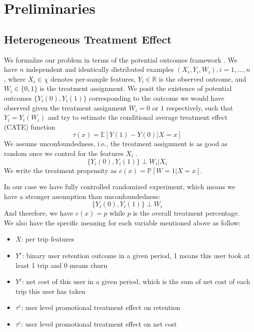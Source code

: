 \section{Preliminaries}

\subsection{Heterogeneous Treatment Effect}

We formalize our problem in terms of the potential outcomes framework \cite{rubin1974estimating}. We have $n$ independent and identically distributed examples $(X_i, Y_i, W_i), i = 1, ..., n$, where $X_i \in \chi$ denotes per-sample features, $Y_i \in \mathbb{R}$ is the observed outcome, and $W_i \in \{0, 1\}$ is the treatment assignment. We posit the existence of potential outcomes $\{Y_i(0), Y_i(1)\}$ corresponding to the outcome we would have observed given the treatment assignment $W_i = 0$ or $1$ respectively, such that $Y_i = Y_i(W_i)$ and try to estimate the conditional average treatment effect (CATE) function 
\begin{equation}
  \label{eq:1}
  \tau(x) = \mathbb{E}[Y(1)-Y(0) | X = x]
\end{equation}
We assume unconfoundedness, i.e., the treatment assignment is as good as random once we control for the features $X_i$ \cite{rosenbaum1983central}.
\begin{equation}
  \label{eq:2}
  \{Y_i(0), Y_i(1)\} \perp W_i|X_i
\end{equation}
We write the treatment propensity as $e(x) = \mathbb{P} [W = 1  | X = x]$.

In our case we have fully controlled randomized experiment, which means we have a stronger assumption than unconfoundedness:
\begin{equation}
  \label{eq:3}
  \{Y_i(0), Y_i(1)\} \perp W_i
\end{equation}
And therefore, we have $e(x) = p$ while $p$ is the overall treatment percentage. We also have the specific meaning for each variable mentioned above as follow:
\begin{itemize}
\item $X$: per trip features
\item $Y^r$: binary user retention outcome in a given period, 1 means this user took at least 1 trip and 0 means churn
\item $Y^c$: net cost of this user in a given period, which is the sum of net cost of each trip this user has taken
\item $\tau^r$: user level promotional treatment effect on retention
\item $\tau^c$: user level promotional treatment effect on net cost
\end{itemize}

